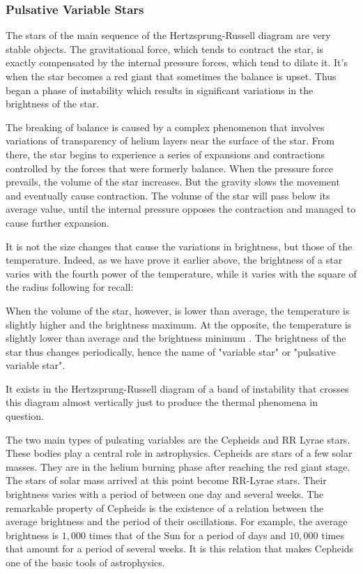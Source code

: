 	\pagebreak
	\subsubsection{Pulsative Variable Stars}
	The stars of the main sequence of the Hertzsprung-Russell diagram are very stable objects. The gravitational force, which tends to contract the star, is exactly compensated by the internal pressure forces, which tend to dilate it. It's when the star becomes a red giant that sometimes the balance is upset. Thus began a phase of instability which results in significant variations in the brightness of the star.

	The breaking of balance is caused by a complex phenomenon that involves variations of transparency of helium layers near the surface of the star. From there, the star begins to experience a series of expansions and contractions controlled by the forces that were formerly balance. When the pressure force prevails, the volume of the star increases. But the gravity slows the movement and eventually cause contraction. The volume of the star will pass below its average value, until the internal pressure opposes the contraction and managed to cause further expansion.

	It is not the size changes that cause the variations in brightness, but those of the temperature. Indeed, as we have prove it earlier above, the brightness of a star varies with the fourth power of the temperature, while it varies with the square of the radius following for recall:
	
	When the volume of the star, however, is lower than average, the temperature is slightly higher and the brightness maximum. At the opposite, the temperature is slightly lower than average and the brightness minimum . The brightness of the star thus changes periodically, hence the name of "variable star" or "pulsative variable star".

	It exists in the Hertzsprung-Russell diagram of a band of instability that crosses this diagram almost vertically just to produce the thermal phenomena in question.

	The two main types of pulsating variables are the Cepheids and RR Lyrae stars. These bodies play a central role in astrophysics. Cepheids are stars of a few solar masses. They are in the helium burning phase after reaching the red giant stage. The stars of solar mass arrived at this point become RR-Lyrae stars. Their brightness varies with a period of between one day and several weeks. The remarkable property of Cepheids is the existence of a relation between the average brightness and the period of their oscillations. For example, the average brightness is $1,000$ times that of the Sun for a period of days and $10,000$ times that amount for a period of several weeks. It is this relation that makes Cepheids one of the basic tools of astrophysics.
	
